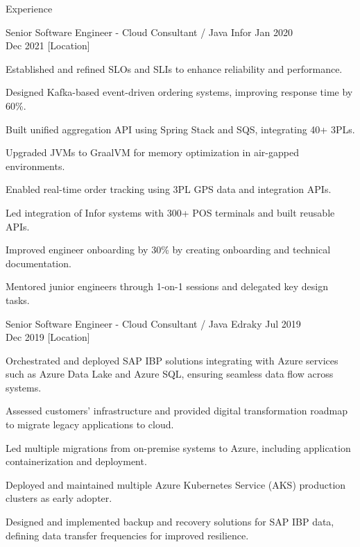 \begin{rSection}{Experience}
    \begin{rSubsection}
        {Senior Software Engineer - Cloud Consultant / Java}
        {Infor}
        {Jan 2020 \\ Dec 2021}
        [Location] %
        \begin{rItemize}
            \item Established and refined SLOs and SLIs to enhance reliability and performance.
            \item Designed Kafka-based event-driven ordering systems, improving response time by 60\%.
            \item Built unified aggregation API using Spring Stack and SQS, integrating 40+ 3PLs.
            \item Upgraded JVMs to GraalVM for memory optimization in air-gapped environments.
            \item Enabled real-time order tracking using 3PL GPS data and integration APIs.
            \item Led integration of Infor systems with 300+ POS terminals and built reusable APIs.
            \item Improved engineer onboarding by 30\% by creating onboarding and technical documentation.
            \item Mentored %
            junior engineers through 1-on-1 sessions and delegated key design tasks.
        \end{rItemize}
    \end{rSubsection}

    \begin{rSubsection}
        {Senior Software Engineer - Cloud Consultant / Java}
        {Edraky}
        {Jul 2019 \\ Dec 2019}
        [Location] %
        \begin{rItemize}
            \item Orchestrated and deployed SAP IBP solutions integrating with Azure services such as Azure Data Lake and Azure SQL, ensuring seamless data flow across systems.
            \item Assessed customers' infrastructure and provided digital transformation roadmap to migrate legacy applications to cloud.
            \item Led multiple migrations from on-premise systems to Azure, including application containerization and deployment.
            \item Deployed and maintained multiple Azure Kubernetes Service (AKS) production clusters as early adopter.
            \item Designed and implemented backup and recovery solutions for SAP IBP data, defining data transfer frequencies for improved resilience.
        \end{rItemize}
    \end{rSubsection}


\end{rSection}
